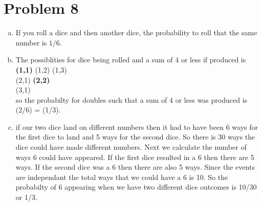 \documentclass[11pt,letterpaper]{article}
\begin{document}
\clearpage

\section*{Problem 8}
\begin{enumerate}[(a)]
\item
If you roll a dice and then another dice, the probability to roll that the same number is $1/6$.
\item
The possiblities for dice being rolled and a sum of 4 or less if produced is\\
\textbf{(1,1)} (1,2) (1,3)\\
(2,1) \textbf{(2,2)}\\
(3,1)\\
so the probabilty for doubles such that a sum of 4 or less was produced is (2/6) = (1/3).
\item
if our two dice land on different numbers then it had to have been 6 ways for the first dice to land and 5 ways for the second dice. So there is 30 ways the dice could have made different numbers. Next we calculate the number of ways 6 could have appeared. If the first dice resulted in a 6 then there are 5 ways. If the second dice was a 6 then there are also 5 ways. Since the events are independant the total ways that we could have a 6 is 10. So the probabilty of 6 appearing when we have two different dice outcomes is 10/30 or 1/3. 
\end{enumerate}
\clearpage
\end{document}
